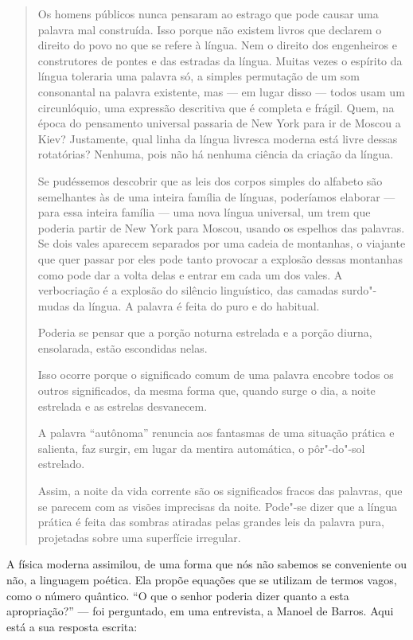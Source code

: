 \begin{quote}
Os homens públicos nunca pensaram ao estrago que pode causar uma palavra
mal construída. Isso porque não existem livros que declarem o direito do
povo no que se refere à língua. Nem o direito dos engenheiros e
construtores de pontes e das estradas da língua. Muitas vezes o espírito
da língua toleraria uma palavra só, a simples permutação de um som
consonantal na palavra existente, mas --- em lugar disso --- todos usam um
circunlóquio, uma expressão descritiva que é completa e frágil. Quem, na
época do pensamento universal passaria de New York para ir de Moscou a
Kiev? Justamente, qual linha da língua livresca moderna está livre
dessas rotatórias? Nenhuma, pois não há nenhuma ciência da criação da
língua.

Se pudéssemos descobrir que as leis dos corpos simples do alfabeto são
semelhantes às de uma inteira família de línguas, poderíamos elaborar ---
para essa inteira família --- uma nova língua universal, um trem que
poderia partir de New York para Moscou, usando os espelhos das palavras.
Se dois vales aparecem separados por uma cadeia de montanhas, o viajante
que quer passar por eles pode tanto provocar a explosão dessas montanhas
como pode dar a volta delas e entrar em cada um dos vales. A
verbocriação é a explosão do silêncio linguístico, das camadas
surdo"-mudas da língua. A palavra é feita do puro e do habitual.

Poderia se pensar que a porção noturna estrelada e a porção diurna,
ensolarada, estão escondidas nelas.

Isso ocorre porque o significado comum de uma palavra encobre todos os
outros significados, da mesma forma que, quando surge o dia, a noite
estrelada e as estrelas desvanecem.

A palavra ``autônoma'' renuncia aos fantasmas de uma situação prática e
salienta, faz surgir, em lugar da mentira automática, o pôr"-do"-sol
estrelado.

Assim, a noite da vida corrente são os significados fracos das palavras,
que se parecem com as visões imprecisas da noite. Pode"-se dizer que a
língua prática é feita das sombras atiradas pelas grandes leis da
palavra pura, projetadas sobre uma superfície irregular.
\end{quote}

A física moderna assimilou, de uma forma que nós não sabemos se
conveniente ou não, a linguagem poética. Ela propõe equações que se
utilizam de termos vagos, como o número quântico. ``O que o senhor poderia
dizer quanto a esta apropriação?'' --- foi perguntado, em uma entrevista, a
Manoel de Barros. Aqui está a sua resposta escrita:

